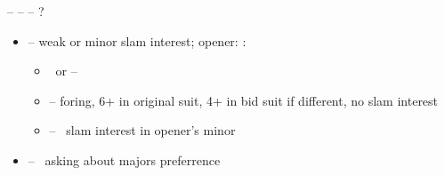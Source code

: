  --  --  -- ?
\begin{itemize}
  \item {} -- weak or minor slam interest; opener: :
  \begin{itemize}
    \item \pass\ or  -- \so
    \item {} -- \not foring, 6+ in original suit, 4+ in bid suit if different, no slam interest
    \item {} -- \force\ slam interest in opener's minor
  \end{itemize}
  \item {} -- \gf\ asking about majors preferrence
\end{itemize}
